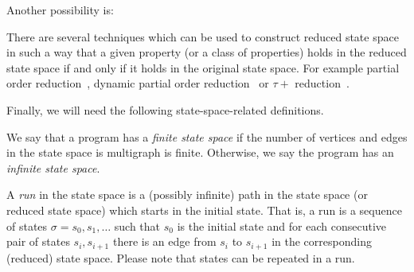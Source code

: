 \begin{definition}
{Another possibility is:\\
}
\end{definition}

There are several techniques which can be used to construct reduced state space in such a way that a given property (or a class of properties) holds in the reduced state space if and only if it holds in the original state space.
For example partial order reduction~\cite{Peled1993}, dynamic partial order reduction~\cite{Flanagan2005dpor} or $\tau+$ reduction~\cite{RBB13}.

Finally, we will need the following state-space-related definitions.

\begin{definition}
We say that a program has a \emph{finite state space} if the number of vertices and edges in the state space is multigraph is finite.
Otherwise, we say the program has an \emph{infinite state space}.
\end{definition}

\begin{definition}[Run]
A \emph{run} in the state space is a (possibly infinite) path in the state space (or reduced state space) which starts in the initial state.
That is, a run is a sequence of states $\sigma = s_0, s_1, …$ such that $s_0$ is the initial state and for each consecutive pair of states $s_i, s_{i+1}$ there is an edge from $s_i$ to $s_{i + 1}$ in the corresponding (reduced) state space.
Please note that states can be repeated in a run.
\end{definition}


